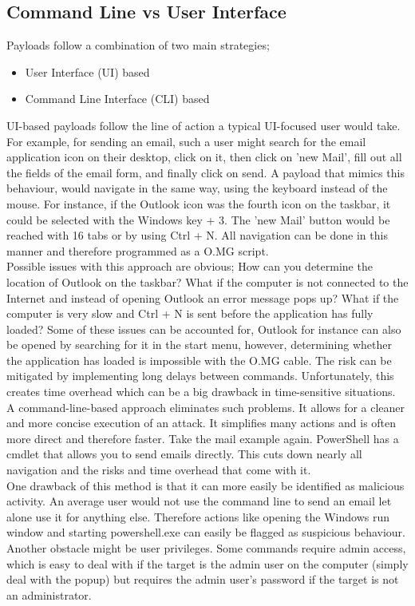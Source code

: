 \subsection{Command Line vs User Interface}

Payloads follow a combination of two main strategies; 
\begin{itemize}
    \item User Interface (UI) based
    \item Command Line Interface (CLI) based
\end{itemize}

UI-based payloads follow the line of action a typical UI-focused user would take. For example, for sending an email, such a user might search for the email application icon on their desktop, click on it, then click on 'new Mail', fill out all the fields of the email form, and finally click on send. A payload that mimics this behaviour, would navigate in the same way, using the keyboard instead of the mouse. For instance, if the Outlook icon was the fourth icon on the taskbar, it could be selected with the Windows key + 3. The 'new Mail' button would be reached with 16 tabs or by using  Ctrl + N. All navigation can be done in this manner and therefore programmed as a O.MG script. \\
Possible issues with this approach are obvious; How can you determine the location of Outlook on the taskbar? What if the computer is not connected to the Internet and instead of opening Outlook an error message pops up? What if the computer is very slow and  Ctrl + N is sent before the application has fully loaded?  Some of these issues can be accounted for, Outlook for instance can also be opened by searching for it in the start menu, however, determining whether the application has loaded is impossible with the O.MG cable. The risk can be mitigated by implementing long delays between commands. Unfortunately, this creates time overhead which can be a big drawback in time-sensitive situations. \\

A command-line-based approach eliminates such problems. It allows for a cleaner and more concise execution of an attack. It simplifies many actions and is often more direct and therefore faster. Take the mail example again. PowerShell has a cmdlet that allows you to send emails directly. This cuts down nearly all navigation and the risks and time overhead that come with it. \\
One drawback of this method is that it can more easily be identified as malicious activity. An average user would not use the command line to send an email let alone use it for anything else. Therefore actions like opening the Windows run window and starting powershell.exe can easily be flagged as suspicious behaviour. Another obstacle might be user privileges. Some commands require admin access, which is easy to deal with if the target is the admin user on the computer (simply deal with the popup) but requires the admin user's password if the target is not an administrator. 


